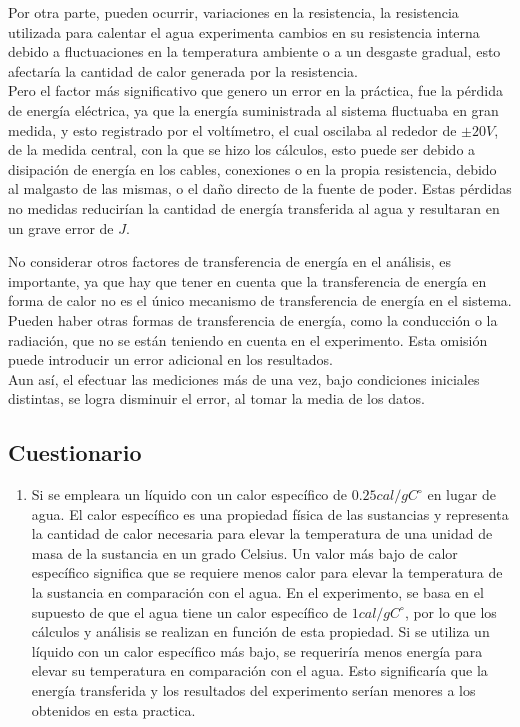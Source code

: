 \documentclass[10pt]{article}
\begin{document}
\begin{multicols*}{2}
Por otra parte, pueden ocurrir, variaciones en la resistencia, la resistencia utilizada para calentar el agua experimenta cambios en su resistencia interna debido a fluctuaciones en la temperatura ambiente o a un desgaste gradual, esto afectaría la cantidad de calor generada por la resistencia.\\

Pero el factor más significativo que genero un error en la práctica, fue la pérdida de energía eléctrica, ya que la energía suministrada al sistema fluctuaba en gran medida, y esto registrado por el voltímetro, el cual oscilaba al rededor de $\pm 20 V$, de la medida central, con la que se hizo los cálculos, esto puede ser debido a disipación de energía en los cables, conexiones o en la propia resistencia, debido al malgasto de las mismas, o el daño directo de la fuente de poder. Estas pérdidas no medidas reducirían la cantidad de energía transferida al agua y resultaran en un grave error de $J.$

No considerar otros factores de transferencia de energía en el análisis, es importante, ya que hay que tener en cuenta que la transferencia de energía en forma de calor no es el único mecanismo de transferencia de energía en el sistema. Pueden haber otras formas de transferencia de energía, como la conducción o la radiación, que no se están teniendo en cuenta en el experimento. Esta omisión puede introducir un error adicional en los resultados.\\

Aun así, el efectuar las mediciones más de una vez, bajo condiciones iniciales distintas, se logra disminuir el error, al tomar la media de los datos.\\

\subsection*{Cuestionario}

\begin{enumerate}
    \item Si se empleara un líquido con un calor específico de $0.25 cal/g C ^\circ$ en lugar de agua. El calor específico es una propiedad física de las sustancias y representa la cantidad de calor necesaria para elevar la temperatura de una unidad de masa de la sustancia en un grado Celsius. Un valor más bajo de calor específico significa que se requiere menos calor para elevar la temperatura de la sustancia en comparación con el agua. En el experimento, se basa en el supuesto de que el agua tiene un calor específico de $1 cal/g C ^\circ$, por lo que los cálculos y análisis se realizan en función de esta propiedad. Si se utiliza un líquido con un calor específico más bajo, se requeriría menos energía para elevar su temperatura en comparación con el agua. Esto significaría que la energía transferida y los resultados del experimento serían menores a los obtenidos en esta practica.


\end{enumerate}
\end{multicols*}
\end{document}
